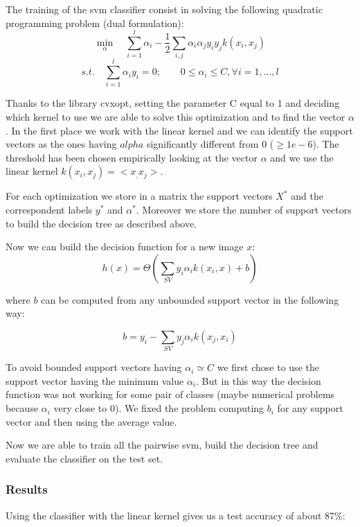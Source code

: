 \documentclass[12pt, a4paper]{report}
\begin{document}
\begin{description}
	The training of the svm classifier consist in solving the following quadratic programming problem (dual formulation):
	$$
	\min_{\alpha}\quad \sum_{i=1}^{l}\alpha_i - \frac{1}{2}\sum_{i,j} \alpha_i \alpha_j y_i y_jk(x_i,x_j)
	$$ 
	$$
	s.t. \quad \sum_{i=1}^{l} \alpha_i y_i = 0; \qquad
	0\leq \alpha_i \leq C, \forall i=1,...,l
	$$
	
	Thanks to the library cvxopt, setting the parameter C equal to 1 and deciding which kernel to use we are able to solve this optimization and to find the vector $\alpha$.
	In the first place we work with the linear kernel and we can identify the support vectors as the ones having $alpha$ significantly different from 0 ($\geq 1e-6$).
	The threshold has been chosen empirically looking at the vector $\alpha$ and we use the linear kernel $k(x_i,x_j)= <x_,x_j>$.
	
	
	For each optimization we store in a matrix the support vectors $X^*$ and the correspondent labels $y^*$ and $\alpha^*$.
	Moreover we store the number of support vectors to build the decision tree as described above.
	
	Now we can build the decision function for a new image $x$:
	$$
	h(x) = \Theta(\sum_{SV} y_i\alpha_i k(x_i,x) + b)
	$$
	
	where $b$ can be computed from any unbounded support vector in the following way:
	
	$$
	b = y_i - \sum_{SV} y_j\alpha_ik(x_j,x_i)
	$$
	
	To avoid bounded support vectors having $\alpha_i \simeq C$ we first chose to use the support vector having the minimum value $\alpha_i$. But in this way the decision function was not working for some pair of classes (maybe numerical problems because $\alpha_i$ very close to 0). We fixed the problem computing $b_i$ for any support vector and then using the average value.
	
\end{description}

Now we are able to train all the pairwise svm, build the decision tree and evaluate the classifier on the test set.

\subsubsection*{Results}
Using the classifier with the linear kernel gives us a test accuracy of about 87\%:
\end{document}
